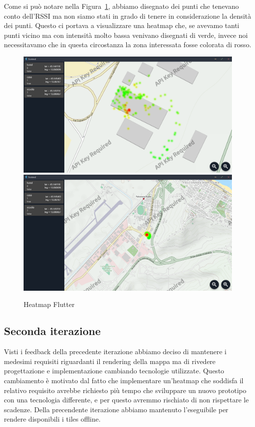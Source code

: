 \documentclass[a4paper]{report}
\begin{document}
Come si può notare nella Figura~\ref{heatmap_flutter}, abbiamo disegnato dei punti che tenevano conto dell'RSSI ma non siamo stati in grado di tenere in considerazione la densità dei punti. Questo ci portava a visualizzare una heatmap che, se avevamo tanti punti vicino ma con intensità molto bassa venivano disegnati di verde, invece noi necessitavamo che in questa circostanza la zona interessata fosse colorata di rosso. 
\begin{figure}[tbp]
    \centering
    \includegraphics[width=.7\textwidth]{figure/heatmap_flutter_small.png}\hfill
    \includegraphics[width=.7\textwidth]{figure/heatmap_flutter_large.png}\hfill
    \caption{Heatmap Flutter}
    \label{heatmap_flutter}
\end{figure}

\subsection*{{Seconda iterazione}}

Visti i feedback della precedente iterazione abbiamo deciso di mantenere i medesimi requisiti riguardanti il rendering della mappa ma di rivedere progettazione e implementazione cambiando tecnologie utilizzate. Questo cambiamento è motivato dal fatto che implementare un'heatmap che soddisfa il relativo requisito avrebbe richiesto più tempo che sviluppare un nuovo prototipo con una tecnologia differente, e per questo avremmo rischiato di non rispettare le scadenze. Della precendente iterazione abbiamo mantenuto l'eseguibile per rendere disponibili i tiles offline.
\end{document}
